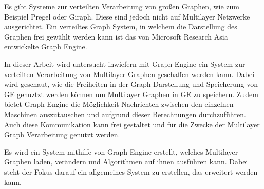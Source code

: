 Es gibt Systeme zur verteilten Verarbeitung von großen Graphen, wie zum Beispiel Pregel oder Giraph. Diese sind jedoch nicht auf Multilayer Netzwerke ausgerichtet.
Ein verteiltes Graph System, in welchem die Darstellung des Graphen frei gewählt werden kann ist das von Microsoft Research Asia entwickelte Graph Engine.


In dieser Arbeit wird untersucht inwiefern mit Graph Engine ein System zur verteilten Verarbeitung von Multilayer Graphen geschaffen werden kann. Dabei wird geschaut, wie die Freiheiten in der Graph Darstellung und Speicherung von GE genuztzt werden können
um Multilayer Graphen in GE zu speichern. Zudem bietet Graph Engine die Möglichkeit Nachrichten zwischen den einzelnen Maschinen auszutauschen und aufgrund dieser Berechnungen durchzuführen. Auch diese Kommunikation kann frei gestaltet und für die Zwecke der Multilayer Graph Verarbeitung genutzt werden.

Es wird ein System mithilfe von Graph Engine erstellt, welches Multilayer Graphen laden, verändern und Algorithmen auf ihnen ausführen kann. 
Dabei steht der Fokus darauf ein allgemeines System zu erstellen, das erweitert werden kann.
